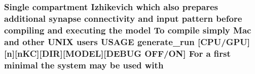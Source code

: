 \hypertarget{userproject_2OneComp__project_2README_8txt_ace09bb40fbf4457ad9a9340a67a4fa9a}{
\subsubsection[{with}]{\setlength{\rightskip}{0pt plus 5cm}Single compartment Izhikevich which also prepares additional synapse connectivity and input pattern before compiling and executing the {\bf model} To compile simply Mac and other U\+N\+I\+X users U\+S\+A\+G\+E {\bf generate\+\_\+run} \mbox{[}{\bf C\+P\+U}/{\bf G\+P\+U}\mbox{]}\mbox{[}n\mbox{]}\mbox{[}n\+K\+C\mbox{]}\mbox{[}D\+I\+R\mbox{]}\mbox{[}M\+O\+D\+E\+L\mbox{]}\mbox{[}D\+E\+B\+U\+G O\+F\+F/O\+N\mbox{]} For a first minimal the {\bf system} may be used with}}\label{userproject_2OneComp__project_2README_8txt_ace09bb40fbf4457ad9a9340a67a4fa9a}
